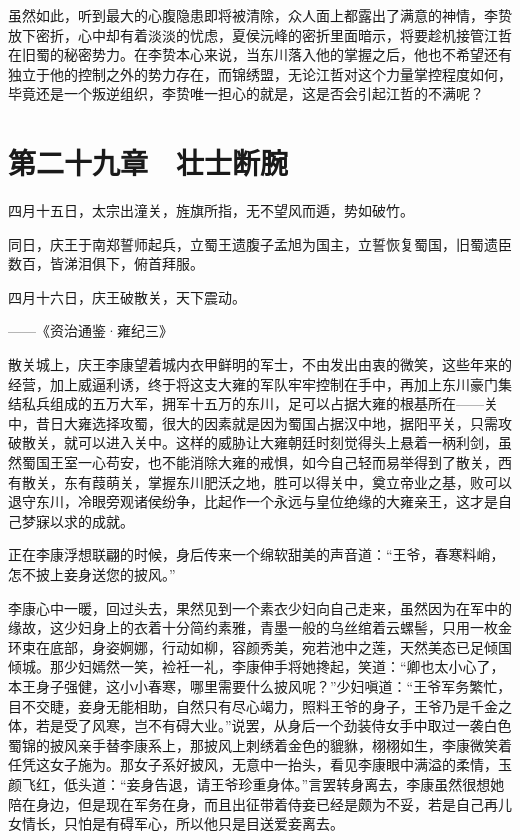 虽然如此，听到最大的心腹隐患即将被清除，众人面上都露出了满意的神情，李贽放下密折，心中却有着淡淡的忧虑，夏侯沅峰的密折里面暗示，将要趁机接管江哲在旧蜀的秘密势力。在李贽本心来说，当东川落入他的掌握之后，他也不希望还有独立于他的控制之外的势力存在，而锦绣盟，无论江哲对这个力量掌控程度如何，毕竟还是一个叛逆组织，李贽唯一担心的就是，这是否会引起江哲的不满呢？

\chapter{第二十九章　壮士断腕}

四月十五日，太宗出潼关，旌旗所指，无不望风而遁，势如破竹。

同日，庆王于南郑誓师起兵，立蜀王遗腹子孟旭为国主，立誓恢复蜀国，旧蜀遗臣数百，皆涕泪俱下，俯首拜服。

四月十六日，庆王破散关，天下震动。

——《资治通鉴·雍纪三》

散关城上，庆王李康望着城内衣甲鲜明的军士，不由发出由衷的微笑，这些年来的经营，加上威逼利诱，终于将这支大雍的军队牢牢控制在手中，再加上东川豪门集结私兵组成的五万大军，拥军十五万的东川，足可以占据大雍的根基所在——关中，昔日大雍选择攻蜀，很大的因素就是因为蜀国占据汉中地，据阳平关，只需攻破散关，就可以进入关中。这样的威胁让大雍朝廷时刻觉得头上悬着一柄利剑，虽然蜀国王室一心苟安，也不能消除大雍的戒惧，如今自己轻而易举得到了散关，西有散关，东有葭萌关，掌握东川肥沃之地，胜可以得关中，奠立帝业之基，败可以退守东川，冷眼旁观诸侯纷争，比起作一个永远与皇位绝缘的大雍亲王，这才是自己梦寐以求的成就。

正在李康浮想联翩的时候，身后传来一个绵软甜美的声音道：“王爷，春寒料峭，怎不披上妾身送您的披风。”

李康心中一暖，回过头去，果然见到一个素衣少妇向自己走来，虽然因为在军中的缘故，这少妇身上的衣着十分简约素雅，青墨一般的乌丝绾着云螺髻，只用一枚金环束在底部，身姿婀娜，行动如柳，容颜秀美，宛若池中之莲，天然美态已足倾国倾城。那少妇嫣然一笑，裣衽一礼，李康伸手将她搀起，笑道：“卿也太小心了，本王身子强健，这小小春寒，哪里需要什么披风呢？”少妇嗔道：“王爷军务繁忙，目不交睫，妾身无能相助，自然只有尽心竭力，照料王爷的身子，王爷乃是千金之体，若是受了风寒，岂不有碍大业。”说罢，从身后一个劲装侍女手中取过一袭白色蜀锦的披风亲手替李康系上，那披风上刺绣着金色的貔貅，栩栩如生，李康微笑着任凭这女子施为。那女子系好披风，无意中一抬头，看见李康眼中满溢的柔情，玉颜飞红，低头道：“妾身告退，请王爷珍重身体。”言罢转身离去，李康虽然很想她陪在身边，但是现在军务在身，而且出征带着侍妾已经是颇为不妥，若是自己再儿女情长，只怕是有碍军心，所以他只是目送爱妾离去。

